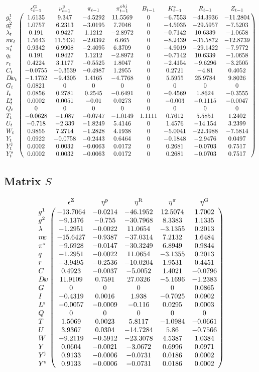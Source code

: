 $$\bordermatrix{
~ & \epsilon^{\mathrm{G}}_{t-1} & \nu^{\mathrm{p}}_{t-1} & \pi_{t-1} & \pi^{\mathrm{obj}}_{t-1} & B_{t-1} & K^{\mathrm{s}}_{t-1} & R_{t-1} & Z_{t-1} \cr
g^{\mathrm{1}}_{t} & 1.6135 & 9.347 & -4.5292 & 11.5569 & 0 & -6.7553 & -44.3936 & -11.2804 \cr
g^{\mathrm{2}}_{t} & 1.0757 & 6.2313 & -3.0195 & 7.7046 & 0 & -4.5035 & -29.5957 & -7.5203 \cr
\lambda_{t} & 0.191 & 0.9427 & 1.1212 & -2.8972 & 0 & -0.7142 & 10.6339 & -1.0658 \cr
{m\!c}_{t} & 1.5643 & 11.5434 & -2.0392 & 6.665 & 0 & -8.2439 & -35.5872 & -12.8739 \cr
\pi^{\star}_{t} & 0.9342 & 6.9908 & -2.4095 & 6.3709 & 0 & -4.9019 & -29.1422 & -7.9772 \cr
q_{t} & 0.191 & 0.9427 & 1.1212 & -2.8972 & 0 & -0.7142 & 10.6339 & -1.0658 \cr
r_{t} & 0.4224 & 3.1177 & -0.5525 & 1.8047 & 0 & -2.4154 & -9.6296 & -3.2505 \cr
C_{t} & -0.0755 & -0.3539 & -0.4987 & 1.2955 & 0 & 0.2721 & -4.81 & 0.4052 \cr
{D\!i\!v}_{t} & -1.1752 & -9.4305 & 1.4165 & -4.7768 & 0 & 5.5955 & 25.9784 & 9.8026 \cr
G_{t} & 0.0821 & 0 & 0 & 0 & 0 & 0 & 0 & 0 \cr
I_{t} & 0.0856 & 0.2781 & 0.2545 & -0.6491 & 0 & -0.4569 & 1.8624 & -0.3555 \cr
L^{\mathrm{s}}_{t} & 0.0002 & 0.0051 & -0.01 & 0.0273 & 0 & -0.003 & -0.1115 & -0.0047 \cr
Q_{t} & 0 & 0 & 0 & 0 & 0 & 0 & 0 & 0 \cr
T_{t} & -0.0628 & -1.087 & -0.0747 & -1.0149 & 1.1111 & 0.7612 & 5.5851 & 1.2402 \cr
U_{t} & -0.718 & -2.339 & -1.8249 & 5.4146 & 0 & 1.4576 & -14.154 & 3.2399 \cr
W_{t} & 0.9855 & 7.2714 & -1.2828 & 4.1938 & 0 & -5.0041 & -22.3988 & -7.5814 \cr
Y_{t} & 0.0922 & -0.0758 & -0.2443 & 0.6464 & 0 & -0.1848 & -2.9476 & 0.0497 \cr
Y^{\mathrm{j}}_{t} & 0.0002 & 0.0032 & -0.0063 & 0.0172 & 0 & 0.2681 & -0.0703 & 0.7517 \cr
Y^{\mathrm{s}}_{t} & 0.0002 & 0.0032 & -0.0063 & 0.0172 & 0 & 0.2681 & -0.0703 & 0.7517 \cr
}$$

\subsection*{Matrix $S$}

$$\bordermatrix{
~ & \epsilon^{\mathrm{Z}} & \eta^{\mathrm{p}} & \eta^{\mathrm{R}} & \eta^{\pi} & \eta^{\mathrm{G}} \cr
g^{\mathrm{1}} & -13.7064 & -0.0214 & -46.1952 & 12.5074 & 1.7002 \cr
g^{\mathrm{2}} & -9.1376 & -0.755 & -30.7968 & 8.3383 & 1.1335 \cr
\lambda & -1.2951 & -0.0022 & 11.0654 & -3.1355 & 0.2013 \cr
{m\!c} & -15.6427 & -0.9387 & -37.0314 & 7.2132 & 1.6484 \cr
\pi^{\star} & -9.6928 & -0.0147 & -30.3249 & 6.8949 & 0.9844 \cr
q & -1.2951 & -0.0022 & 11.0654 & -3.1355 & 0.2013 \cr
r & -3.9495 & -0.2536 & -10.0204 & 1.9531 & 0.4451 \cr
C & 0.4923 & -0.0037 & -5.0052 & 1.4021 & -0.0796 \cr
{D\!i\!v} & 11.9109 & 0.7591 & 27.0326 & -5.1696 & -1.2383 \cr
G & 0 & 0 & 0 & 0 & 0.0865 \cr
I & -0.4319 & 0.0016 & 1.938 & -0.7025 & 0.0902 \cr
L^{\mathrm{s}} & -0.0057 & -0.0009 & -0.116 & 0.0295 & 0.0003 \cr
Q & 0 & 0 & 0 & 0 & 0 \cr
T & 1.5069 & 0.0023 & 5.8117 & -1.0984 & -0.0661 \cr
U & 3.9367 & 0.0304 & -14.7284 & 5.86 & -0.7566 \cr
W & -9.2119 & -0.5912 & -23.3078 & 4.5387 & 1.0384 \cr
Y & 0.0604 & -0.0021 & -3.0672 & 0.6996 & 0.0971 \cr
Y^{\mathrm{j}} & 0.9133 & -0.0006 & -0.0731 & 0.0186 & 0.0002 \cr
Y^{\mathrm{s}} & 0.9133 & -0.0006 & -0.0731 & 0.0186 & 0.0002 \cr
}$$


